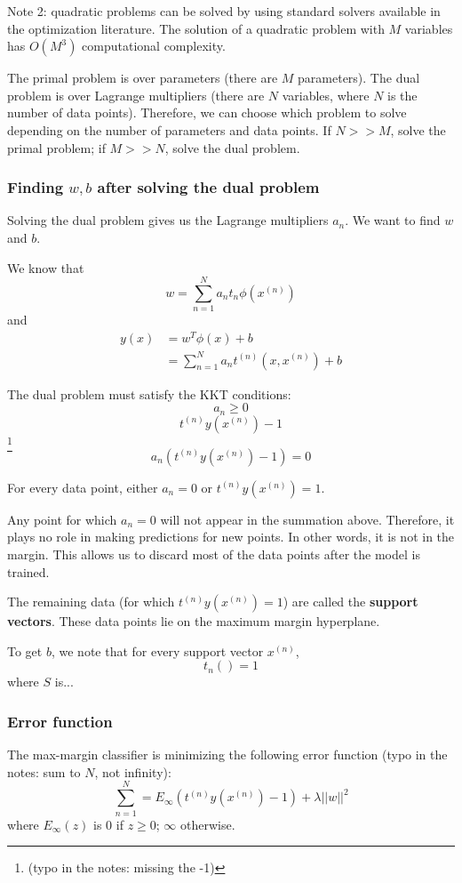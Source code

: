 \documentclass[a4paper,12pt]{article}
\begin{document}
Note 2: quadratic problems can be solved by using standard solvers available in the optimization literature. The solution of a quadratic problem with $M$ variables has $O(M^3)$ computational complexity. 

The primal problem is over parameters (there are $M$ parameters). The dual problem is over Lagrange multipliers (there are $N$ variables, where $N$ is the number of data points). Therefore, we can choose which problem to solve depending on the number of parameters and data points. If $N>>M$, solve the primal problem; if $M>>N$, solve the dual problem. 

\subsubsection{Finding $w, b$ after solving the dual problem}

Solving the dual problem gives us the Lagrange multipliers $a_n$. We want to find $w$ and $b$. 

We know that 
$$w = \sum_{n=1}^N a_n t_n \phi (x^{(n)})$$ 
and 
\begin{align*}
y(x) &= w^T \phi(x) + b\\
	&= \sum_{n=1}^N a_n t^{(n)} (x, x^{(n)}) + b
\end{align*}

The dual problem must satisfy the KKT conditions: 
$$a_n \geq 0$$
$$t^{(n)} y (x^{(n)}) - 1$$ \footnote{(typo in the notes: missing the -1)}
$$a_n (t^{(n)} y (x^{(n)}) - 1) = 0$$

For every data point, either $a_n=0$ or $t^{(n)} y (x^{(n)}) = 1$. 

Any point for which $a_n=0$ will not appear in the summation above. Therefore, it plays no role in making predictions for new points. In other words, it is not in the margin. This allows us to discard most of the data points after the model is trained. 

The remaining data (for which $t^{(n)} y (x^{(n)}) = 1$) are called the \textbf{support vectors}. These data points lie on the maximum margin hyperplane. 

To get $b$, we note that for every support vector $x^{(n)}$, 
$$t_n() = 1$$
where $S$ is...

\subsubsection{Error function}

The max-margin classifier is  minimizing the following error function (typo in the notes: sum to $N$, not infinity): 
$$\sum_{n=1}^N = E_{\infty} (t^{(n)} y (x^{(n)}) - 1) + \lambda ||w||^2$$
where $E_\infty(z)$ is 0 if $z\geq 0$; $\infty$ otherwise. 
\end{document}
